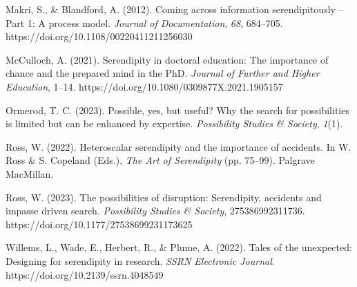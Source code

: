 \documentclass[authordate, commentary]{jote-new-article}
\begin{document}
	Makri, S., \& Blandford, A. (2012). Coming across information serendipitously -- Part 1: A process model. \emph{Journal of Documentation}, \emph{68}, 684--705. https://doi.org/10.1108/00220411211256030



	McCulloch, A. (2021). Serendipity in doctoral education: The importance of chance and the prepared mind in the PhD. \emph{Journal of Further and Higher Education}, 1--14. https://doi.org/10.1080/0309877X.2021.1905157



	Ormerod, T. C. (2023). Possible, yes, but useful? Why the search for possibilities is limited but can be enhanced by expertise. \emph{Possibility Studies \& Society}, \emph{1}(1).



	Ross, W. (2022). Heteroscalar serendipity and the importance of accidents. In W. Ross \& S. Copeland (Eds.), \emph{The Art of Serendipity} (pp. 75--99). Palgrave MacMillan.



	Ross, W. (2023). The possibilities of disruption: Serendipity, accidents and impasse driven search. \emph{Possibility Studies \& Society}, 275386992311736. https://doi.org/10.1177/27538699231173625



	Willems, L., Wade, E., Herbert, R., \& Plume, A. (2022). Tales of the unexpected: Designing for serendipity in research. \emph{SSRN Electronic Journal}. https://doi.org/10.2139/ssrn.4048549
\end{document}
